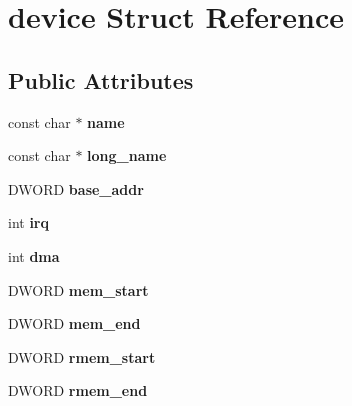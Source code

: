 \hypertarget{structdevice}{
\section{device Struct Reference}
\label{structdevice}
}
\subsection*{Public Attributes}
\begin{DoxyCompactItemize}
\item 
\hypertarget{structdevice_a1e74e8d3b0b1a981c67e1d0284ccac3d}{
const char $\ast$ {\bfseries name}}
\label{structdevice_a1e74e8d3b0b1a981c67e1d0284ccac3d}

\item 
\hypertarget{structdevice_a70f6b43843745a112d0688f315ebb6ad}{
const char $\ast$ {\bfseries long\_\-name}}
\label{structdevice_a70f6b43843745a112d0688f315ebb6ad}

\item 
\hypertarget{structdevice_aec8fbce40c03f5a6d95987948e2437e4}{
DWORD {\bfseries base\_\-addr}}
\label{structdevice_aec8fbce40c03f5a6d95987948e2437e4}

\item 
\hypertarget{structdevice_a121c1c21ab1e3251d769da7f04daa431}{
int {\bfseries irq}}
\label{structdevice_a121c1c21ab1e3251d769da7f04daa431}

\item 
\hypertarget{structdevice_aa071fa4d8a3b7cc6569bcba3754ffe47}{
int {\bfseries dma}}
\label{structdevice_aa071fa4d8a3b7cc6569bcba3754ffe47}

\item 
\hypertarget{structdevice_a53e37e8745b76b9ff32604364f336efb}{
DWORD {\bfseries mem\_\-start}}
\label{structdevice_a53e37e8745b76b9ff32604364f336efb}

\item 
\hypertarget{structdevice_a4bf35b739a16f05036f1cd8db820d6b7}{
DWORD {\bfseries mem\_\-end}}
\label{structdevice_a4bf35b739a16f05036f1cd8db820d6b7}

\item 
\hypertarget{structdevice_a60c96c9c538ea12e1b5f356ed5b55f58}{
DWORD {\bfseries rmem\_\-start}}
\label{structdevice_a60c96c9c538ea12e1b5f356ed5b55f58}

\item 
\hypertarget{structdevice_a105c246c437a233d05192fa268f7e037}{
DWORD {\bfseries rmem\_\-end}}
\label{structdevice_a105c246c437a233d05192fa268f7e037}


\end{DoxyCompactItemize}
